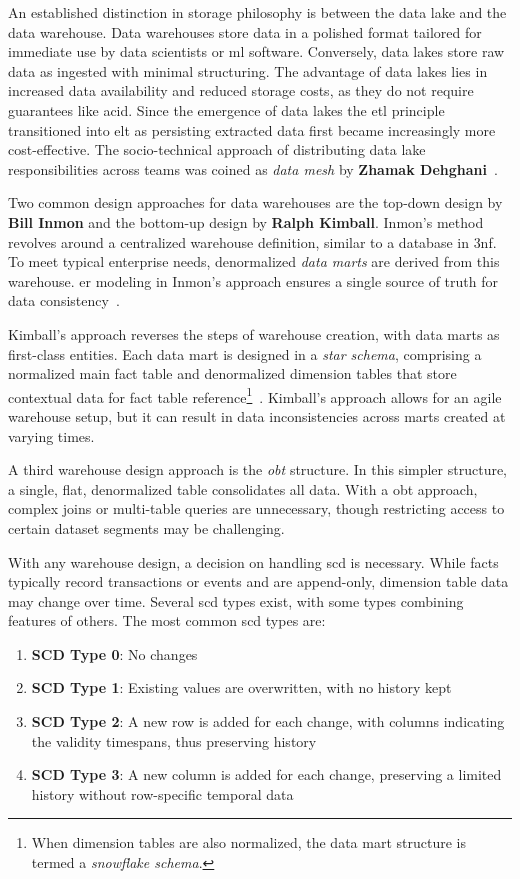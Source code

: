An established distinction in storage philosophy is between the data lake and the data warehouse.
Data warehouses store data in a polished format tailored for immediate use by data scientists or \ac{ml} software.
Conversely, data lakes store raw data as ingested with minimal structuring.
The advantage of data lakes lies in increased data availability and reduced storage costs, as they do not require guarantees like \ac{acid}.
Since the emergence of data lakes the \ac{etl} principle transitioned into \ac{elt} as persisting extracted data first became increasingly more cost-effective.
The socio-technical approach of distributing data lake responsibilities across teams was coined as \textit{data mesh} by \textbf{Zhamak Dehghani}~\cite{Dehghani2019}.

Two common design approaches for data warehouses are the top-down design by \textbf{Bill Inmon} and the bottom-up design by \textbf{Ralph Kimball}.
Inmon's method revolves around a centralized warehouse definition, similar to a database in \ac{3nf}.
To meet typical enterprise needs, denormalized \textit{data marts} are derived from this warehouse.
\ac{er} modeling in Inmon's approach ensures a single source of truth for data consistency~\cite{Inmon2002}.

Kimball's approach reverses the steps of warehouse creation, with data marts as first-class entities.
Each data mart is designed in a \textit{star schema}, comprising a normalized main fact table and denormalized dimension tables that store contextual data for fact table reference\footnote{When dimension tables are also normalized, the data mart structure is termed a \textit{snowflake schema}.}~\cite{Kimball2013}.
Kimball's approach allows for an agile warehouse setup, but it can result in data inconsistencies across marts created at varying times.

A third warehouse design approach is the \textit{\ac{obt}} structure.
In this simpler structure, a single, flat, denormalized table consolidates all data.
With a \ac{obt} approach, complex joins or multi-table queries are unnecessary, though restricting access to certain dataset segments may be challenging.

With any warehouse design, a decision on handling \ac{scd} is necessary.
While facts typically record transactions or events and are append-only, dimension table data may change over time.
Several \ac{scd} types exist, with some types combining features of others.
The most common \ac{scd} types are:

\begin{enumerate}
    \item[] \textbf{SCD Type 0}: No changes
    \item[] \textbf{SCD Type 1}: Existing values are overwritten, with no history kept
    \item[] \textbf{SCD Type 2}: A new row is added for each change, with columns indicating the validity timespans, thus preserving history
    \item[] \textbf{SCD Type 3}: A new column is added for each change, preserving a limited history without row-specific temporal data
\end{enumerate}

